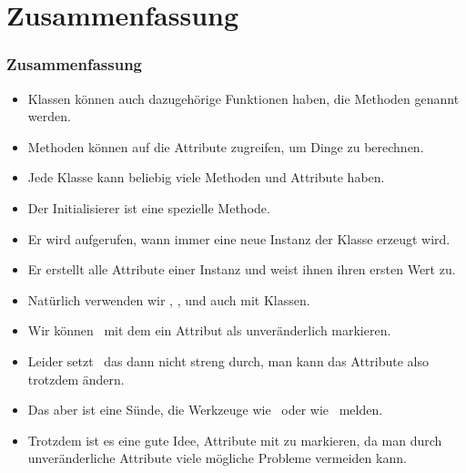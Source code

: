 \documentclass[aspectratio=169,mathserif,notheorems]{beamer}%
\begin{document}
\section{Zusammenfassung}%
%
\begin{frame}[t]%
\frametitle{Zusammenfassung}%
%
\begin{itemize}%
%
%
%
%
\item<4-> Klassen können auch dazugehörige Funktionen haben, die Methoden genannt werden.%
%
\item<5-> Methoden können auf die Attribute zugreifen, um Dinge zu berechnen.
%
\item<6-> Jede Klasse kann beliebig viele Methoden und Attribute haben.%
%
\item<7-> Der Initialisierer  ist eine spezielle Methode.%
%
\item<8-> Er wird aufgerufen, wann immer eine neue Instanz der Klasse erzeugt wird.%
%
\item<9-> Er erstellt alle Attribute einer Instanz und weist ihnen ihren ersten Wert zu.%
%
\item<10-> Natürlich verwenden wir , , und  auch mit Klassen.%
%
\item<11-> Wir können \DEzB\ mit dem  ein Attribut als unveränderlich markieren.%
%
\item<12-> Leider setzt \python\ das dann nicht streng durch, man kann das Attribute also trotzdem ändern.%
%
\item<13-> Das aber ist eine Sünde, die Werkzeuge wie \mypy\ oder  wie \pycharm\ melden.%
%
\item<14-> Trotzdem ist es eine gute Idee, Attribute mit  zu markieren, da man durch unveränderliche Attribute viele mögliche Probleme vermeiden kann.%
\end{itemize}%
\end{frame}%
%
\endPresentation%
\end{document}
